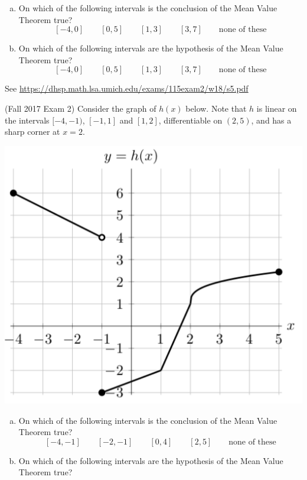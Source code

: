 \documentclass[11pt]{exam}
\begin{document}
\begin{questions}
\begin{enumerate}[(a)]
	\item On which of the following intervals is the conclusion of the Mean Value Theorem true?
	$$[-4,0] \qquad [0,5] \qquad [1,3] \qquad [3,7] \qquad \textrm{none of these}$$
	\item On which of the following intervals are the hypothesis of the Mean Value Theorem true?
	$$[-4,0] \qquad [0,5] \qquad [1,3] \qquad [3,7] \qquad \textrm{none of these}$$
\end{enumerate}
\begin{solution}
  See \href{https://dhsp.math.lsa.umich.edu/exams/115exam2/w18/s5.pdf}{https://dhsp.math.lsa.umich.edu/exams/115exam2/w18/s5.pdf}
\end{solution}
\question (Fall 2017 Exam 2) Consider the graph of $h(x)$ below. Note that \(h\) is linear on the intervals $[-4,-1)$, $[-1,1]$ and $[1,2]$, differentiable on $(2, 5)$, and has a sharp corner at $x = 2$.
\begin{center}
  \includegraphics[scale=0.4]{Exam2Fall2017Problem4}
\end{center}
\begin{enumerate}[(a)]
	\item On which of the following intervals is the conclusion of the Mean Value Theorem true?
	$$[-4,-1] \qquad [-2,-1] \qquad [0,4] \qquad [2,5] \qquad \textrm{none of these}$$
	\item On which of the following intervals are the hypothesis of the Mean Value Theorem true?

\end{enumerate}
\end{questions}
\end{document}
